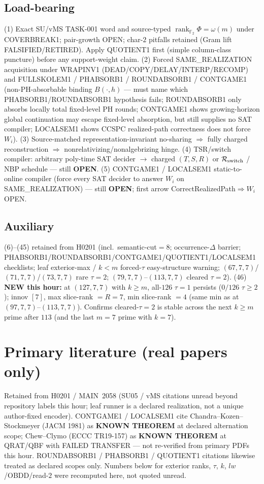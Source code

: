 \documentclass[11pt]{article}
\begin{document}
\subsection*{Load-bearing}
(1) Exact SU/vMS TASK-001 word and source-typed
$\operatorname{rank}_{\mathbb F_2}\Phi=\omega(m)$ under COVERBREAK1; pair-growth OPEN;
char-$2$ pitfalls retained (Gram lift FALSIFIED/RETIRED). Apply QUOTIENT1 first
(simple column-class puncture) before any support-weight claim.
(2) Forced SAME\_REALIZATION acquisition under WRAPINV1
(DEAD/COPY/DELAY/INTERP/RECOMP) and FULLSKOLEM1 / PHABSORB1 / ROUNDABSORB1 / CONTGAME1
(non-PH-absorbable binding $B(\cdot,h)$ --- must name which PHABSORB1/ROUNDABSORB1
hypothesis fails; ROUNDABSORB1 only absorbs locally total fixed-level PH rounds;
CONTGAME1 shows growing-horizon global continuation may escape fixed-level absorption,
but still supplies no SAT compiler; LOCALSEM1 shows CCSPC realized-path correctness
does not force $W_i$).
(3) Source-matched representation-invariant no-sharing $\Rightarrow$ fully charged reconstruction
$\Rightarrow$ nonrelativizing/nonalgebrizing hinge.
(4) TSR/switch compiler: arbitrary poly-time SAT decider $\to$ charged $(T,S,R)$ or
$\mathcal R_{\rm switch}$ / NBP schedule --- still \textbf{OPEN}.
(5) CONTGAME1 / LOCALSEM1 static-to-online compiler (force every SAT decider to answer $W_i$ on
SAME\_REALIZATION) --- still \textbf{OPEN}; first arrow CorrectRealizedPath$\Rightarrow W_i$ OPEN.

\subsection*{Auxiliary}
(6)--(45) retained from H0201 (incl.\ semantic-cut$=8$; occurrence-$\Delta$ barrier;
PHABSORB1/ROUNDABSORB1/CONTGAME1/QUOTIENT1/LOCALSEM1 checklists; leaf exterior-max / $k{<}m$ forced-$\tau$ easy-structure warning;
$(67,7,7)$/$(71,7,7)$/$(73,7,7)$ rare $\tau{=}2$; $(79,7,7)$--$(113,7,7)$ cleared $\tau{=}2$).
(46) \textbf{NEW this hour:} at $(127,7,7)$ with $k{\ge}m$, all-$126$ $\tau{=}1$ persists
($0/126$ $\tau{\ge}2$); innov $[7]$, max slice-rank $=R{=}7$, min slice-rank $=4$
(same min as at $(97,7,7)$--$(113,7,7)$). Confirms cleared-$\tau{=}2$
is stable across the next $k{\ge}m$ prime after $113$ (and the last $m{=}7$ prime with $k{=}7$).

\section*{Primary literature (real papers only)}
Retained from H0201 / MAIN~2058 (SU05 / vMS citations unread beyond repository labels this hour;
leaf runner is a declared realization, not a unique author-fixed encoder).
CONTGAME1 / LOCALSEM1 cite Chandra--Kozen--Stockmeyer (JACM 1981) as \textbf{KNOWN THEOREM}
at declared alternation scope; Chew--Clymo (ECCC TR19-157) as \textbf{KNOWN THEOREM} at
QRAT/QBF with FAILED TRANSFER --- not re-verified from primary PDFs this hour.
ROUNDABSORB1 / PHABSORB1 / QUOTIENT1 citations likewise treated as declared scopes only.
Numbers below for exterior ranks, $\tau$, $k$, $lw$/OBDD/read-$2$
were recomputed here, not quoted unread.
\end{document}
